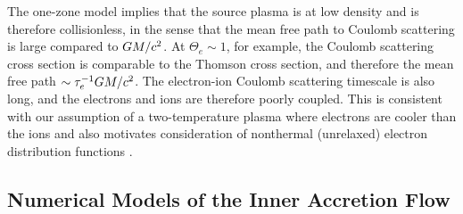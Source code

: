 The one-zone model implies that the source plasma is at low density and is therefore collisionless, in the sense that the mean free path to Coulomb scattering is large compared to $GM/c^2$.
At $\Theta_e \sim 1$, for example, the Coulomb scattering cross section is comparable to the Thomson cross section, and therefore the mean free path $\sim \tau_e^{-1} GM/c^2$.
The electron-ion Coulomb scattering timescale is also long, and the electrons and ions are therefore poorly coupled.
This is consistent with our assumption of a two-temperature  plasma where electrons are cooler than the ions \citep{1976ApJ...204..187S,1977ApJ...214..840I, 1982Natur.295...17R} and also motivates consideration of
nonthermal (unrelaxed) electron distribution functions \citep[see]{2000ApJ...541..234O, 2009ApJ...701..521C, 2014A&A...570A...7M, 2018A&A...612A..34D, 2021arXiv211102518F, 2021NatAs.tmp..218C, Chatterjee2021, 2021arXiv211203933E, Scepi2021}.

\subsection{Numerical Models of the Inner Accretion Flow}

